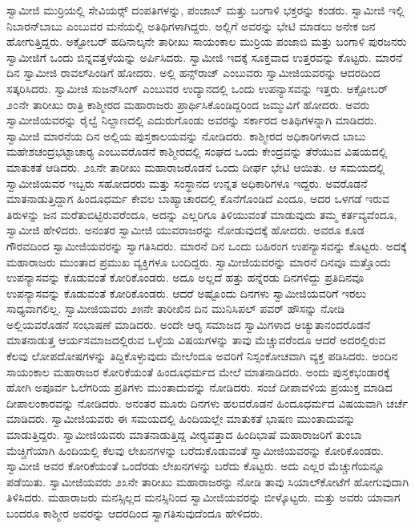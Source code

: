  ಸ್ವಾಮೀಜಿ ಮುರ‍್ರಿಯಲ್ಲಿ ಸೇವಿಯರ್ಸ್‍‍ ದಂಪತಿಗಳನ್ನು, ಪಂಜಾಬ್ ಮತ್ತು ಬಂಗಾಳಿ ಭಕ್ತರನ್ನು ಕಂಡರು. ಸ್ವಾಮೀಜಿ ಇಲ್ಲಿ ನಿಬಾರನ್‍ಬಾಬು ಎಂಬುವರ ಮನೆಯಲ್ಲಿ ಅತಿಥಿಗಳಾಗಿದ್ದರು. ಅಲ್ಲಿಗೆ ಅವರನ್ನು ಭೇಟಿ ಮಾಡಲು ಅನೇಕ ಜನ ಹೋಗುತ್ತಿದ್ದರು. ಅಕ್ಟೋಬರ್ ಹದಿನಾಲ್ಕನೇ ತಾರೀಖು ಸಾಯಂಕಾಲ ಮುರ‍್ರಿಯ ಪಂಜಾಬಿ ಮತ್ತು ಬಂಗಾಳಿ ಪುರಜನರು ಸ್ವಾಮೀಜಿಗೆ ಒಂದು ಬಿನ್ನವತ್ತಳೆಯನ್ನು ಅರ್ಪಿಸಿದರು. ಸ್ವಾಮೀಜಿ ಇದಕ್ಕೆ ಸೂಕ್ತವಾದ ಉತ್ತರವನ್ನು ಕೊಟ್ಟರು. ಮಾರನೆ ದಿನ ಸ್ವಾಮೀಜಿ ರಾವಲ್‍ಪಿಂಡಿಗೆ ಹೋದರು. ಅಲ್ಲಿ ಹನ್ಸ್‌ರಾಜ್ ಎಂಬುವರು ಸ್ವಾಮೀಜಿಯವರನ್ನು ಆದರದಿಂದ ಸತ್ಕರಿಸಿದರು. ಸ್ವಾಮೀಜಿ ಸುಜನ್‍ಸಿಂಗ್ ಎಂಬುವರ ಉದ್ಯಾನದಲ್ಲಿ ಒಂದು ಉಪನ್ಯಾಸವನ್ನು ಇತ್ತರು. ಅಕ್ಟೋಬರ್ ೨೦ನೇ ತಾರೀಖು ರಾತ್ರಿ ಕಾಶ್ಮೀರದ ಮಹಾರಾಜರು ಪ್ರಾರ್ಥಿಸಿಕೊಂಡಿದ್ದರಿಂದ ಜಮ್ಮುವಿಗೆ ಹೋದರು. ಅವರು ಸ್ವಾಮೀಜಿಯವರನ್ನು ರೈಲ್ವೆ ನಿಲ್ದಾಣದಲ್ಲಿ ಎದುರುಗೊಂಡು ಅವರನ್ನು ಸರ್ಕಾರದ ಅತಿಥಿಗಳನ್ನಾಗಿ ಮಾಡಿದರು. ಸ್ವಾಮೀಜಿ ಮಾರನೆಯ ದಿನ ಅಲ್ಲಿಯ ಪುಸ್ತಕಾಲಯವನ್ನು ನೋಡಿದರು. ಕಾಶ್ಮೀರದ ಅಧಿಕಾರಿಗಳಾದ ಬಾಬು ಮಹೇಶಚಂದ್ರಭಟ್ಟಾಚಾರ‍್ಯ ಎಂಬುವರೊಡನೆ ಕಾಶ್ಮೀರದಲ್ಲಿ ಸಂಘದ ಒಂದು ಕೇಂದ್ರವನ್ನು ತೆರೆಯುವ ವಿಷಯದಲ್ಲಿ ಮಾತುಕತೆ ಆಡಿದರು. ೨೩ನೇ ತಾರೀಖು ಮಹಾರಾಜರೊಡನೆ ಒಂದು ದೀರ್ಘ ಭೇಟಿ ಆಯಿತು. ಆ ಸಮಯದಲ್ಲಿ ಸ್ವಾಮೀಜಿಯವರ ಇಬ್ಬರು ಸಹೋದರರು ಮತ್ತು ಸಂಸ್ಥಾನದ ಉನ್ನತ ಅಧಿಕಾರಿಗಳೂ ಇದ್ದರು. ಅವರೊಡನೆ ಮಾತನಾಡುತ್ತಿದ್ದಾಗ ಹಿಂದೂಧರ್ಮ ಕೇವಲ ಬಾಹ್ಯಾಚಾರದಲ್ಲಿ ಕೊನೆಗೊಂಡಿದೆ ಎಂದೂ, ಅದರ ಒಳಗಡೆ ಇರುವ ತಿರುಳನ್ನು ಜನ ಮರೆತುಬಿಟ್ಟಿರುವರೆಂದೂ, ಅದನ್ನು ಎಲ್ಲರಿಗೂ ತಿಳಿಯುವಂತೆ ಮಾಡುವುದು ತಮ್ಮ ಕರ್ತವ್ಯವೆಂದೂ, ಸ್ವಾಮೀಜಿ ಹೇಳಿದರು. ಅನಂತರ ಸ್ವಾಮೀಜಿ ಯುವರಾಜರನ್ನು ನೋಡುವುದಕ್ಕೆ ಹೋದರು. ಅವರೂ ಕೂಡ ಗೌರವದಿಂದ ಸ್ವಾಮೀಜಿಯವರನ್ನು ಸ್ವಾಗತಿಸಿದರು. ಮಾರನೆ ದಿನ ಒಂದು ಬಹಿರಂಗ ಉಪನ್ಯಾಸವನ್ನು ಕೊಟ್ಟರು. ಅದಕ್ಕೆ ಮಹಾರಾಜರು ಮುಂತಾದ ಪ್ರಮುಖ ವ್ಯಕ್ತಿಗಳೂ ಬಂದಿದ್ದರು. ಸ್ವಾಮೀಜಿಯವರನ್ನು ಮಾರನೆ ದಿನವೂ ಮತ್ತೊಂದು ಉಪನ್ಯಾಸವನ್ನು ಕೊಡುವಂತೆ ಕೋರಿಕೊಂಡರು. ಅದೂ ಅಲ್ಲದೆ ಹತ್ತು ಹನ್ನೆರಡು ದಿನಗಳಿದ್ದು ಪ್ರತಿದಿನವೂ ಉಪನ್ಯಾಸವನ್ನು ಕೊಡುವಂತೆ ಕೋರಿಕೊಂಡರು. ಆದರೆ ಅಷ್ಟೊಂದು ದಿನಗಳು ಸ್ವಾಮೀಜಿಯವರಿಗೆ ಇರಲು ಸಾಧ್ಯವಾಗಲಿಲ್ಲ. ಸ್ವಾಮೀಜಿಯವರು ೨೫ನೇ ತಾರೀಖಿನ ದಿನ ಮುನಿಸಿಪಲ್ ಪವರ್ ಹೌಸನ್ನು ನೋಡಿ ಅಲ್ಲಿಯವರೊಡನೆ ಸಂಭಾಷಣೆ ಮಾಡಿದರು. ಅಂದೇ ಆರ‍್ಯ ಸಮಾಜದ ಸ್ವಾಮಿಗಳಾದ ಅಚ್ಯುತಾನಂದರೊಡನೆ ಮಾತನಾಡುತ್ತ ಆರ್ಯಸಮಾಜದಲ್ಲಿರುವ ಒಳ್ಳೆಯ ವಿಷಯಗಳನ್ನು ತಾವು ಮೆಚ್ಚುವರೆಂದೂ ಆದರೆ ಅದರಲ್ಲಿರುವ ಕೆಲವು ಲೋಪದೋಷಗಳನ್ನು ತಿದ್ದಿಕೊಳ್ಳುವುದು ಮೇಲೆಂದೂ‌ ಅವರಿಗೆ ನಿಸ್ಸಂಕೋಚವಾಗಿ ವ್ಯಕ್ತ ಪಡಿಸಿದರು. ಅಂದಿನ ಸಾಯಂಕಾಲ ಮಹಾರಾಜರ ಕೋರಿಕೆಯಂತೆ ಹಿಂದೂಧರ್ಮದ ಮೇಲೆ ಮಾತನಾಡಿದರು. ಅಂದು ಪುಸ್ತಕಭಂಡಾರಕ್ಕೆ ಹೋಗಿ ಅಪೂರ್ವ ಓಲೆಗರಿಯ ಪ್ರತಿಗಳು ಮುಂತಾದುವನ್ನು ನೋಡಿದರು. ಸಂಜೆ ದೀಪಾವಳಿಯ ಪ್ರಯುಕ್ತ ಮಾಡಿದ ದೀಪಾಲಂಕಾರವನ್ನು ನೋಡಿದರು. ಅನಂತರ ಮೂರು ದಿನಗಳು ಹಲವರೊಡನೆ ಹಿಂದೂಧರ್ಮದ ವಿಷಯವಾಗಿ ಚರ್ಚೆ ಮಾಡಿದರು. ಸ್ವಾಮೀಜಿಯವರು ಈ ಸಮಯದಲ್ಲಿ ಹಿಂದಿಯಲ್ಲೇ ಮಾತುಕತೆ ಭಾಷಣ ಮುಂತಾದುವನ್ನು ಮಾಡುತ್ತಿದ್ದರು. ಸ್ವಾಮೀಜಿಯವರು ಮಾತನಾಡುತ್ತಿದ್ದ ವೀರ‍್ಯವತ್ತಾದ ಹಿಂದಿಭಾಷೆ ಮಹಾರಾಜರಿಗೆ ತುಂಬಾ ಮೆಚ್ಚಿಗೆಯಾಗಿ ಹಿಂದಿಯಲ್ಲಿ ಕೆಲವು ಲೇಖನಗಳನ್ನು ಬರೆದುಕೊಡುವಂತೆ ಸ್ವಾಮೀಜಿಯವರನ್ನು ಕೋರಿಕೊಂಡರು. ಸ್ವಾಮೀಜಿ ಅವರ ಕೋರಿಕೆಯಂತೆ ಒಂದೆರಡು ಲೇಖನಗಳನ್ನು ಬರೆದು ಕೊಟ್ಟರು. ಅದು ಎಲ್ಲರ ಮೆಚ್ಚುಗೆಯನ್ನೂ ಪಡೆಯಿತು. ಸ್ವಾಮೀಜಿಯವರು ೨೩ನೇ ತಾರೀಖು ಮಹಾರಾಜರನ್ನು ನೋಡಿ ತಾವು ಸಿಯಾಲ್‍ಕೋಟೆಗೆ ಹೋಗುವುದಾಗಿ ತಿಳಿಸಿದರು. ಮಹಾರಾಜರು ಮನಸ್ಸಿಲ್ಲದ ಮನಸ್ಸಿನಿಂದ ಸ್ವಾಮೀಜಿಯವರನ್ನು ಬೀಳ್ಕೊಟ್ಟರು. ಮತ್ತು ಅವರು ಯಾವಾಗ ಬಂದರೂ ಕಾಶ್ಮೀರ ಅವರನ್ನು ಆದರದಿಂದ ಸ್ವಾಗತಿಸುವುದೆಂದೂ ಹೇಳಿದರು. 

